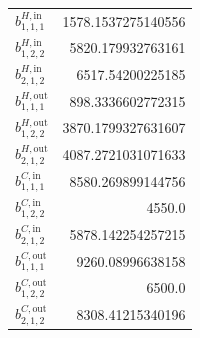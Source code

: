 \documentclass{article}%
\begin{document}
\begin{multicols*}{3}
\begin{supertabular}{lr}
	$b_{1,1,1}^{H,\text{in}}$ & 1578.1537275140556 \\%
	$b_{1,2,2}^{H,\text{in}}$ & 5820.179932763161 \\%
	$b_{2,1,2}^{H,\text{in}}$ & 6517.54200225185 \\%
	$b_{1,1,1}^{H,\text{out}}$ & 898.3336602772315 \\%
	$b_{1,2,2}^{H,\text{out}}$ & 3870.1799327631607 \\%
	$b_{2,1,2}^{H,\text{out}}$ & 4087.2721031071633 \\%
	$b_{1,1,1}^{C,\text{in}}$ & 8580.269899144756 \\%
	$b_{1,2,2}^{C,\text{in}}$ & 4550.0 \\%
	$b_{2,1,2}^{C,\text{in}}$ & 5878.142254257215 \\%
	$b_{1,1,1}^{C,\text{out}}$ & 9260.08996638158 \\%
	$b_{1,2,2}^{C,\text{out}}$ & 6500.0 \\%
	$b_{2,1,2}^{C,\text{out}}$ & 8308.41215340196 \\%
\end{supertabular}%
\end{multicols*}%
\clearpage%
\end{document}
